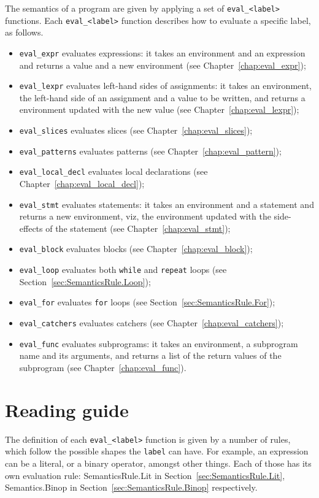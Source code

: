 \documentclass{book}
\begin{document}
The semantics of a program are given by applying a set of
\texttt{eval\_<label>} functions. Each \texttt{eval\_<label>} function
describes how to evaluate a specific label, as follows.
\begin{itemize}
\item \texttt{eval\_expr} evaluates expressions: it takes an
environment and an expression and returns a value and a
new environment (see Chapter~\ref{chap:eval_expr});
\item \texttt{eval\_lexpr} evaluates left-hand sides of assignments: it takes
an environment, the left-hand side of an assignment and a value to be written,
and returns a environment updated with the new value (see
Chapter~\ref{chap:eval_lexpr});
\item \texttt{eval\_slices} evaluates slices (see Chapter~\ref{chap:eval_slices});
\item \texttt{eval\_patterns} evaluates patterns (see Chapter~\ref{chap:eval_pattern});
\item \texttt{eval\_local\_decl} evaluates local declarations (see Chapter~\ref{chap:eval_local_decl});
\item \texttt{eval\_stmt} evaluates statements: it takes an
environment and a statement and returns a new
environment, viz, the environment updated with the side-effects
of the statement (see Chapter~\ref{chap:eval_stmt});
\item \texttt{eval\_block} evaluates blocks (see Chapter~\ref{chap:eval_block});
\item \texttt{eval\_loop} evaluates both \texttt{while} and \texttt{repeat} loops (see Section~\ref{sec:SemanticsRule.Loop});
\item \texttt{eval\_for} evaluates \texttt{for} loops (see Section~\ref{sec:SemanticsRule.For});
\item \texttt{eval\_catchers} evaluates catchers (see Chapter~\ref{chap:eval_catchers});
\item \texttt{eval\_func} evaluates subprograms: it takes an
environment, a subprogram name and its arguments, and returns a
list of the return values of the subprogram (see Chapter~\ref{chap:eval_func}). 
\end{itemize}

\chapter{Reading guide}

The definition of each \texttt{eval\_<label>} function is given by a number of
rules, which follow the possible shapes the \texttt{label} can have. For
example, an expression can be a literal, or a binary operator, amongst other
things. Each of those has its own evaluation rule: SemanticsRule.Lit in
Section~\ref{sec:SemanticsRule.Lit}, Semantics.Binop in
Section~\ref{sec:SemanticsRule.Binop} respectively.
\end{document}
